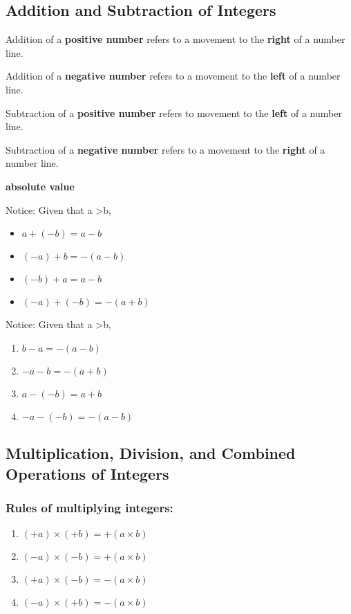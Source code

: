 \documentclass[../main]{subfiles}
\begin{document}
\subsection{Addition and Subtraction of Integers}

Addition of a \textbf{positive number} refers to a movement to the \textbf{right} of a
number line.

Addition of a \textbf{negative number} refers to a movement to the \textbf{left}
of a number line.

Subtraction of a \textbf{positive number} refers to movement to the
\textbf{left} of a number line.

Subtraction of a \textbf{negative number} refers to a movement to the
\textbf{right} of a number line.

\textbf{absolute value}

Notice: Given that a \textgreater b,
\begin{itemize}
\item \(a + (-b) = a - b \)
\item \((-a) +b = -(a - b)\)
\item \((-b)+ a = a -b\)
\item \((-a)+(-b)= -(a+b)\)
\end{itemize}



Notice: Given that a \textgreater b,
\begin{enumerate}
\item \(b -a = -(a - b)\)
\item \(-a -b = -(a + b)\)
\item \(a - (-b) = a + b\)
\item \(-a -(-b) = - (a-b)\)
\end{enumerate}


\subsection{Multiplication, Division, and Combined Operations of Integers}
\subsubsection{Rules of multiplying integers:}
\begin{enumerate}
\item \((+a) \times (+b) = +(a \times b)\)  
\item \((-a) \times (-b) = +(a \times b)\) 
\item \((+a) \times (-b) = -(a \times b)\)
\item \((-a) \times (+b) = -(a \times b) \)

\end{enumerate}
\end{document}
